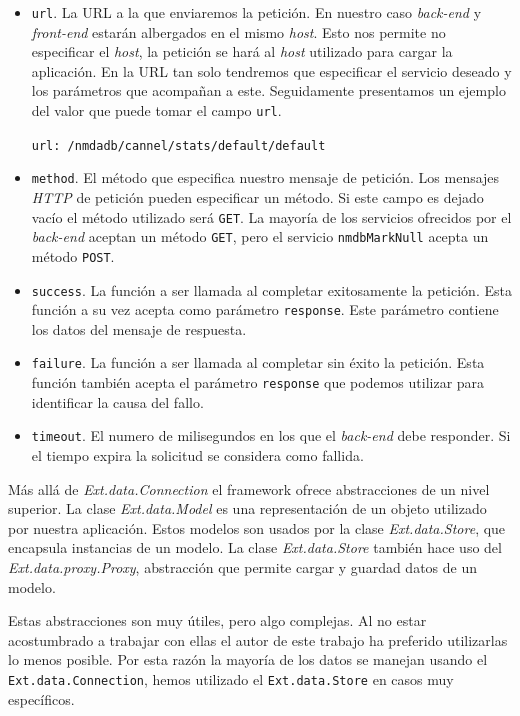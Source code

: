 	\begin{itemize}
  		\item	\texttt{url}. 	La URL a la que enviaremos la petición. En nuestro caso \emph{back-end} y \emph{front-end} estarán albergados en
		  	el mismo \emph{host}. Esto nos permite no especificar el \emph{host}, la petición se hará al \emph{host} utilizado para cargar
			la aplicación. En la URL tan solo tendremos que especificar el servicio deseado y los parámetros que acompañan a este.
			Seguidamente presentamos un ejemplo del valor que puede tomar el campo \texttt{url}.
    				\begin{center} \texttt{url: \cc/nmdadb/cannel/stats/default/default\cc}  \end{center}
		\item	\texttt{method}. El método que especifica nuestro mensaje de petición. Los mensajes \emph{HTTP} de petición pueden especificar
		  	un método. Si este campo es dejado vacío el método utilizado será \texttt{GET}. La mayoría de los servicios ofrecidos por el
			\emph{back-end} aceptan un método \texttt{GET}, pero el servicio \texttt{nmdbMarkNull} acepta un método \texttt{POST}.
		\item	\texttt{success}. La función a ser llamada al completar exitosamente la petición. Esta función a su vez acepta como parámetro
		  	\texttt{response}. Este parámetro contiene los datos del mensaje de respuesta.
		\item	\texttt{failure}. La función a ser llamada al completar sin éxito la petición. Esta función también acepta el parámetro
		  	\texttt{response} que podemos utilizar para identificar la causa del fallo.
		\item	\texttt{timeout}. El numero de milisegundos en los que el \emph{back-end} debe responder. Si el tiempo expira la solicitud se
		  	considera como fallida. 
	\end{itemize}
	Más allá de \emph{Ext.data.Connection} el framework ofrece abstracciones de un nivel superior. La clase \emph{Ext.data.Model} es una
	representación de un objeto utilizado por nuestra aplicación. Estos modelos son usados por la clase \emph{Ext.data.Store}, que encapsula
	instancias de un modelo. La clase \emph{Ext.data.Store} también hace uso del \emph{Ext.data.proxy.Proxy}, abstracción que permite cargar y
	guardad datos de un modelo. 
	\par
	Estas abstracciones son muy útiles, pero algo complejas. Al no estar acostumbrado a trabajar con ellas el autor de este trabajo ha preferido
	utilizarlas lo menos posible. Por esta razón la mayoría de los datos se manejan usando el \texttt{Ext.data.Connection}, hemos utilizado el
	\texttt{Ext.data.Store} en casos muy específicos.
